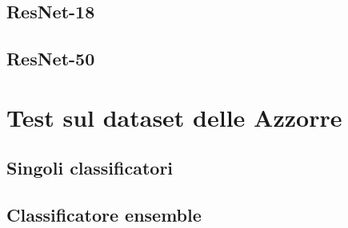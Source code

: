 \subsection{ResNet-18}

\vspace{3mm}

\subsection{ResNet-50}


\section{Test sul dataset delle Azzorre}

\subsection{Singoli classificatori}

\vspace{3mm}

\subsection{Classificatore ensemble}


